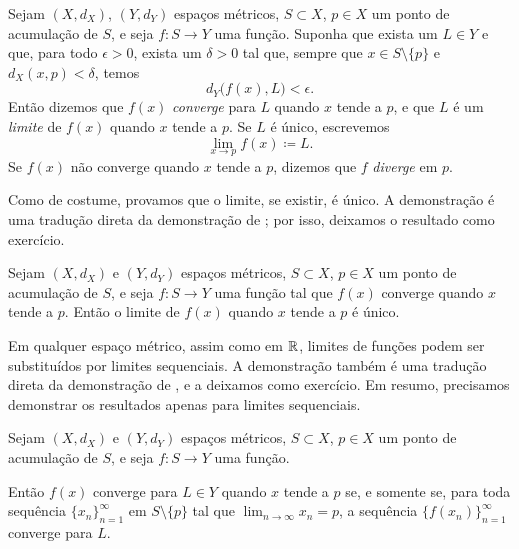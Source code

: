 \begin{defn}
%
Sejam $(X,d_X)$, $(Y,d_Y)$ espaços métricos, $S \subset X$, $p \in X$ um ponto de acumulação de $S$,
e seja $f \colon S \to Y$ uma função.
Suponha que exista um $L \in Y$ e que, para todo $\epsilon > 0$,
exista um $\delta > 0$ tal que, sempre que $x \in S \setminus \{ p \}$
e $d_X(x,p) < \delta$, temos
\begin{equation*}
d_Y\bigl(f(x),L\bigr) < \epsilon .
\end{equation*}
Então dizemos que $f(x)$
\emph{converge} para $L$ quando $x$ tende
a $p$, e que $L$ é um \emph{limite} de $f(x)$ quando $x$
tende a $p$. Se $L$ é único, escrevemos
\begin{equation*}
\lim_{x \to p} f(x) \coloneqq L .
\end{equation*}
Se $f(x)$ não converge quando $x$ tende a $p$, dizemos que $f$
\emph{diverge} em $p$.
\end{defn}

Como de costume, provamos que o limite, se existir, é único.
A demonstração é uma tradução direta da demonstração
de ; por isso, deixamos o resultado como exercício.

\begin{prop} \label{prop:mslimitisunique}
Sejam $(X,d_X)$ e $(Y,d_Y)$ espaços métricos, $S \subset X$, $p \in X$
um ponto de acumulação de $S$, e seja $f \colon S \to Y$ uma função
tal que $f(x)$ converge quando $x$ tende a $p$. Então
o limite de $f(x)$ quando $x$ tende a $p$ é único.
\end{prop}

Em qualquer espaço métrico, assim como em ${\mathbb{R}}$, limites de funções podem ser
substituídos por limites sequenciais. A demonstração também é uma tradução direta
da demonstração de , e a deixamos como
exercício. Em resumo, precisamos demonstrar os resultados apenas para
limites sequenciais.

\begin{lemma}\label{ms:seqflimit:lemma}
Sejam $(X,d_X)$ e $(Y,d_Y)$ espaços métricos, $S \subset X$, $p \in X$
um ponto de acumulação de $S$, e seja $f \colon S \to Y$ uma função.

Então
$f(x)$ converge para $L \in Y$ quando $x$ tende a $p$ se, e somente se, para toda
sequência $\{ x_n \}_{n=1}^\infty$
em $S \setminus \{p\}$
tal que $\lim_{n\to\infty} x_n = p$,
a sequência $\bigl\{ f(x_n) \bigr\}_{n=1}^\infty$ converge para $L$.
\end{lemma}

